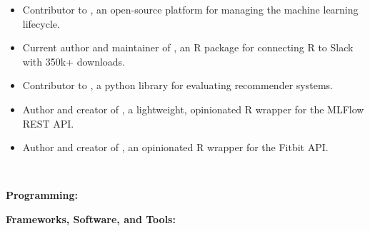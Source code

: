 \documentclass[10pt,a4paper,ragged2e,withhyper]{/Users/matt/documents/GitHub/mrkaye97.github.io/resume/altacv}
\newcommand{\MYhref}[3][red]{\href{#2}{\color{#1}{#3}}}%
\begin{document}
		\divider 
				

		\begin{itemize}
		\item Contributor to \MYhref{https://github.com/mlflow/mlflow}{MLFlow}, an open-source platform for managing the machine learning lifecycle.
		\item Current author and maintainer of \MYhref{https://github.com/mrkaye97/slackr}{slackr}, an R package for connecting R to Slack with 350k+ downloads.
		\item Contributor to \MYhref{https://github.com/statisticianinstilettos/recmetrics}{recmetrics}, a python library for evaluating recommender systems.
		\item Author and creator of \MYhref{https://github.com/collegevine/lightMLFlow}{lightMLFlow}, a lightweight, opinionated R wrapper for the MLFlow REST API.
		\item Author and creator of \MYhref{https://github.com/mrkaye97/fitbitr}{fitbitr}, an opinionated R wrapper for the Fitbit API.
		\end{itemize}

		\divider
		
		\setcolumnwidth{4cm, 5cm,5cm} 
		\begin{paracol}{3}

		
		\divider\\


		\switchcolumn
		
		\textbf{Programming:}\\
		\medskip

		\smallskip
		\textbf{Frameworks, Software, and Tools:}\\
		\medskip

		 \\
		  \\
		 \\

		\switchcolumn
		
		
		\\
		\\
		\\
		\\
		\\
		\\
		
		\end{paracol}
\end{document}

